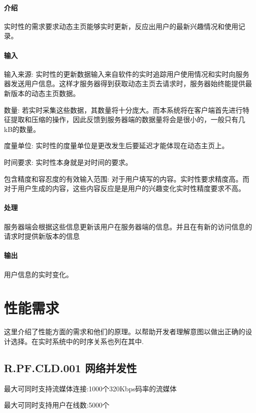 \paragraph{介绍}
实时性的需求要求动态主页能够实时更新，反应出用户的最新兴趣情况和使用记录。
\paragraph{输入}
输入来源:
实时性的更新数据输入来自软件的实时追踪用户使用情况和实时向服务器发送用户信息。这样才服务器得到获取动态主页去请求时，服务器始终能提供最新版本的动态主页数据。

数量:
若实时采集这些数据，其数量将十分庞大。而本系统将在客户端首先进行特征提取和压缩的操作，因此反馈到服务器端的数据量将会是很小的，一般只有几kB的数量。

度量单位:
实时性的度量单位是更改发生后要延迟才能体现在动态主页上。

时间要求:
实时性本身就是对时间的要求。

包含精度和容忍度的有效输入范围:
对于用户填写的内容。实时性要求精度高。而对于用户生成的内容，这些内容反应是是用户的兴趣变化实时性精度要求不高。

\paragraph{处理}
服务器端会根据这些信息更新该用户在服务器端的信息。并且在有新的访问信息的请求时提供新版本的信息

\paragraph{输出}
用户信息的实时变化。







\section{性能需求}


这里介绍了性能方面的需求和他们的原理。以帮助开发者理解意图以做出正确的设计选择。在实时系统中的时序关系也列在其中.
\subsection{R.PF.CLD.001 网络并发性}

最大可同时支持流媒体连接:1000个320Kbps码率的流媒体

最大可同时支持用户在线数:5000个



